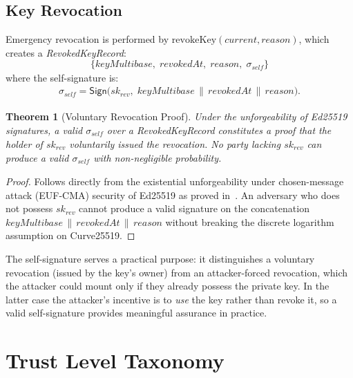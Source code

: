 \documentclass[conference]{IEEEtran}
\newtheorem{theorem}{Theorem}
\newcommand{\Sign}{\mathsf{Sign}}
\begin{document}
\subsection{Key Revocation}

Emergency revocation is performed by
$\mathrm{revokeKey}(\mathit{current}, \mathit{reason})$, which
creates a \textit{RevokedKeyRecord}:
\[
\{
  \mathit{keyMultibase},\;
  \mathit{revokedAt},\;
  \mathit{reason},\;
  \sigma_{\mathit{self}}
\}
\]
where the self-signature is:
{\small\begin{align*}
  \sigma_{\mathit{self}} = \Sign\bigl(\mathit{sk}_{\mathit{rev}},\;
    \mathit{keyMultibase} \,\|\,
    \mathit{revokedAt} \,\|\,
    \mathit{reason}\bigr).
\end{align*}}

\begin{theorem}[Voluntary Revocation Proof]
\label{thm:revocation}
Under the unforgeability of Ed25519 signatures, a valid
$\sigma_{\mathit{self}}$ over a \textit{RevokedKeyRecord}
constitutes a proof that the holder of $\mathit{sk}_{\mathit{rev}}$
voluntarily issued the revocation. No party lacking
$\mathit{sk}_{\mathit{rev}}$ can produce a valid
$\sigma_{\mathit{self}}$ with non-negligible probability.
\end{theorem}
\begin{proof}
Follows directly from the existential unforgeability under
chosen-message attack (EUF-CMA) security of Ed25519 as proved
in~\cite{bernstein2011ed25519}. An adversary who does not
possess $\mathit{sk}_{\mathit{rev}}$ cannot produce a valid
signature on the concatenation
$\mathit{keyMultibase} \,\|\, \mathit{revokedAt} \,\|\,
\mathit{reason}$ without breaking the discrete logarithm
assumption on Curve25519.
\end{proof}

The self-signature serves a practical purpose: it distinguishes
a voluntary revocation (issued by the key's owner) from an
attacker-forced revocation, which the attacker could mount only
if they already possess the private key. In the latter case the
attacker's incentive is to \emph{use} the key rather than revoke
it, so a valid self-signature provides meaningful assurance in
practice.

\section{Trust Level Taxonomy}
\label{sec:trust}
\end{document}
